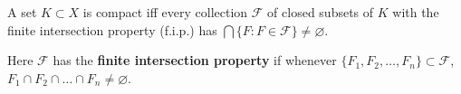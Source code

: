 A set $K \subset X$ is compact iff every collection $\mathcal{F}$ of closed subsets of $K$ with the finite intersection property (f.i.p.) has $\bigcap \{F: F \in \mathcal{F}\} \neq \varnothing$.

Here $\mathcal{F}$ has the \textbf{finite intersection property} if whenever $\{F_1, F_2, \ldots, F_n\} \subset \mathcal{F}$, $F_1 \cap F_2 \cap \ldots \cap F_n \neq \varnothing$.
